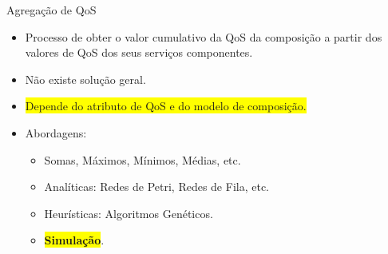 \documentclass[xcolor=svgnames]{beamer}
\begin{document}
   \begin{frame}{Agregação de QoS}
        \begin{itemize}
          \item Processo de obter o valor cumulativo da QoS da composição a partir dos valores de QoS dos seus serviços
          componentes.
          \item Não existe solução geral.
          \item \colorbox{yellow}{Depende do atributo de QoS e do modelo de composição.}
          \item Abordagens:
          \begin{itemize}
            \item Somas, Máximos, Mínimos, Médias, etc.
            \item Analíticas: Redes de Petri, Redes de Fila, etc.
            \item Heurísticas: Algoritmos Genéticos.
            \item \colorbox{yellow}{\textbf{Simulação}}.
          \end{itemize}

        \end{itemize}
    \end{frame}

\end{document}
